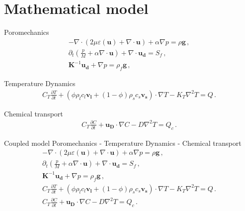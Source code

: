 \documentclass{beamer}
\begin{document}
\section{Mathematical model}
\begin{frame}{Poromechanics}
	\begin{align*}
 	-\nabla \cdot \left(  2\mu\varepsilon (\mathbf{u}) + \nabla\cdot \mathbf{u}\right) + \alpha \nabla p=\rho\mathbf{g} \, ,\\
 	\partial_t \left(\frac{p}{M} + \alpha \nabla \cdot \mathbf{u}\right)+ \nabla\cdot \mathbf{u_d}=S_f\,,\\ 
 	\mathbf{K}^{-1}\mathbf{u_d} + \nabla p = \rho_f\mathbf{g}\,,
 \end{align*}
\end{frame}
\begin{frame}{Temperature Dynamics}
	\begin{align*}
 	C_T\frac{\partial T}{\partial t} +
 	\left(  \phi\rho_l c_l \mathbf{v_l} 
 	+  (1 - \phi)\rho_s c_s \mathbf{v_s} \right)\cdot \nabla T- K_T \nabla^2 T 
 	= Q\,.
 \end{align*}
\end{frame}
\begin{frame}{Chemical transport}
	\begin{align*}
 	C_T\frac{\partial C}{\partial t} +
 	\mathbf{u_D} \cdot \nabla C- D\nabla^2 T 
 	= Q_c\,.
 \end{align*}
\end{frame}
\begin{frame}{Coupled model}
Poromechanics - Temperature Dynamics - Chemical transport
	\begin{align*}
 	-\nabla \cdot \left(  2\mu\varepsilon (\mathbf{u}) + \nabla\cdot \mathbf{u}\right) + \alpha \nabla p=\rho\mathbf{g} \, ,\\
 	\partial_t \left(\frac{p}{M} + \alpha \nabla \cdot \mathbf{u}\right)+ \nabla\cdot \mathbf{u_d}=S_f\,,\\ 
 	\mathbf{K}^{-1}\mathbf{u_d} + \nabla p = \rho_f\mathbf{g}\,,\\
 	C_T\frac{\partial T}{\partial t} +
 	\left(  \phi\rho_l c_l \mathbf{v_l} 
 	+  (1 - \phi)\rho_s c_s \mathbf{v_s} \right)\cdot \nabla T- K_T \nabla^2 T 
 	= Q\,.\\
 	C_T\frac{\partial C}{\partial t} +
 	\mathbf{u_D} \cdot \nabla C- D\nabla^2 T 
 	= Q_c\,.
 \end{align*}
\end{frame}
\end{document}
